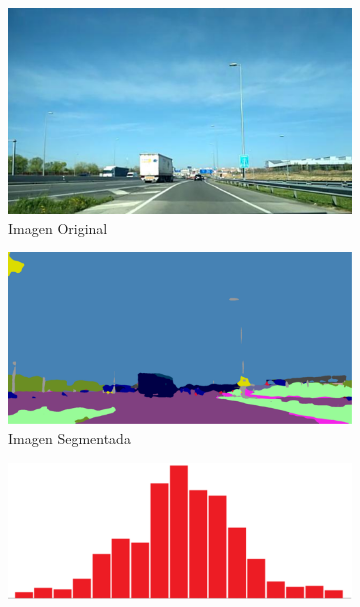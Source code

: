 \begin{figure}[H]
  \centering
  \begin{subfigure}[b]{0.4\linewidth}
    \includegraphics[width=\linewidth]{Figuras/Imagen_Original.eps}
    \caption{Imagen Original}
    \label{fig:ImgOrig}
  \end{subfigure}
    \begin{subfigure}[b]{0.45\linewidth}
    \includegraphics[width=\linewidth]{Figuras/Ejemplo_Imagen_Segmentada.eps}
    \caption{Imagen Segmentada}
    \label{fig:ImgSegm}
  \end{subfigure}
    \begin{subfigure}[b]{0.4\linewidth}
    \includegraphics[width=\linewidth]{Figuras/Ejemplo_Histograma.eps}

\end{subfigure}
\end{figure}
